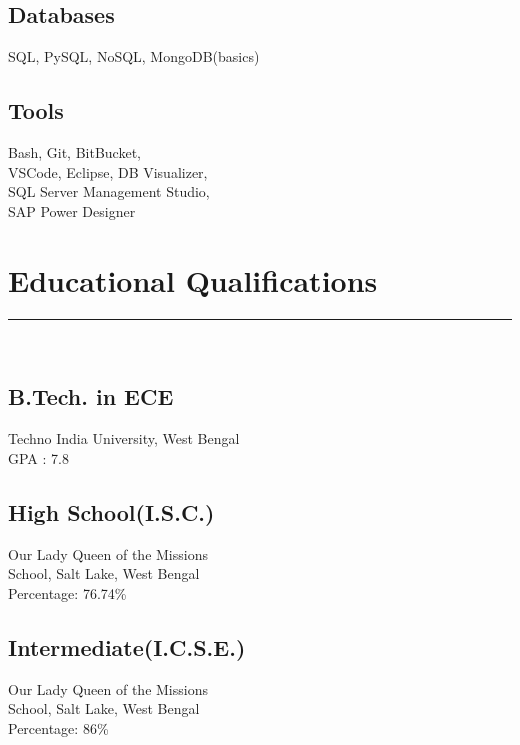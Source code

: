 \documentclass[]{DD_Resume_21}
\begin{document}
\begin{minipage}[t]{0.33\textwidth}
\subsection{Databases}
SQL, PySQL, NoSQL, MongoDB(basics)
\vspace{6pt}
\subsection{Tools}
Bash, Git, BitBucket,\\
VSCode, Eclipse, DB Visualizer,\\
SQL Server Management Studio,\\
SAP Power Designer
\sectionsep
\section{Educational Qualifications} 
\noindent\rule{5cm}{0.4pt}\\
\subsection{B.Tech. in ECE}
Techno India University, West Bengal \\
GPA : 7.8\\
\vspace{8pt}
\subsection{High School(I.S.C.)}
Our Lady Queen of the Missions\\
School, Salt Lake, West Bengal\\
Percentage: 76.74\%\\
\vspace{8pt}
\subsection{Intermediate(I.C.S.E.)}
Our Lady Queen of the Missions\\
School, Salt Lake, West Bengal\\
Percentage: 86\%
\sectionsep
%
%

\end{minipage} 
\hfill
\end{document}

